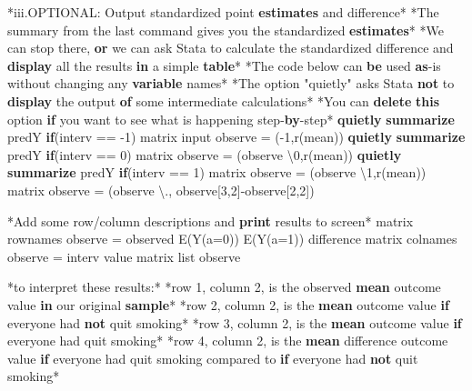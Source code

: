 \documentclass[
  10pt,
]{book}
\newenvironment{Shaded}{\begin{snugshade}}{\end{snugshade}}
\newcommand{\FunctionTok}[1]{\textcolor[rgb]{0.00,0.00,0.00}{#1}}
\newcommand{\KeywordTok}[1]{\textcolor[rgb]{0.13,0.29,0.53}{\textbf{#1}}}
\newcommand{\NormalTok}[1]{#1}
\newcommand{\OtherTok}[1]{\textcolor[rgb]{0.56,0.35,0.01}{#1}}
\newcommand{\StringTok}[1]{\textcolor[rgb]{0.31,0.60,0.02}{#1}}
\begin{document}
\begin{Shaded}
\begin{Highlighting}[]
\NormalTok{*iii.OPTIONAL: Output standardized point }\KeywordTok{estimates}\NormalTok{ and difference*}
\NormalTok{*The summary from the }\FunctionTok{last}\NormalTok{ command gives you the standardized }\KeywordTok{estimates}\NormalTok{*}
\NormalTok{*We can stop there, }\KeywordTok{or}\NormalTok{ we can ask Stata to calculate the standardized difference and }\KeywordTok{display} \OtherTok{all}\NormalTok{ the results }\KeywordTok{in}\NormalTok{ a simple }\KeywordTok{table}\NormalTok{*}
\NormalTok{*The code below can }\KeywordTok{be}\NormalTok{ used }\KeywordTok{as}\NormalTok{{-}is without changing any }\KeywordTok{variable}\NormalTok{ names*}
\NormalTok{*The option }\StringTok{"quietly"}\NormalTok{ asks Stata }\KeywordTok{not}\NormalTok{ to }\KeywordTok{display}\NormalTok{ the output }\KeywordTok{of}\NormalTok{ some intermediate calculations*}
\NormalTok{*You can }\KeywordTok{delete} \KeywordTok{this}\NormalTok{ option }\KeywordTok{if}\NormalTok{ you want to see what is happening step{-}}\KeywordTok{by}\NormalTok{{-}step*}
\KeywordTok{quietly} \KeywordTok{summarize}\NormalTok{ predY }\KeywordTok{if}\NormalTok{(interv == {-}1)}
\FunctionTok{matrix}\NormalTok{ input observe = ({-}1,}\OtherTok{\textasciigrave{}r(mean)\textquotesingle{}}\NormalTok{)}
\KeywordTok{quietly} \KeywordTok{summarize}\NormalTok{ predY }\KeywordTok{if}\NormalTok{(interv == 0)}
\FunctionTok{matrix}\NormalTok{ observe = (observe \textbackslash{}0,}\OtherTok{\textasciigrave{}r(mean)\textquotesingle{}}\NormalTok{)}
\KeywordTok{quietly} \KeywordTok{summarize}\NormalTok{ predY }\KeywordTok{if}\NormalTok{(interv == 1)}
\FunctionTok{matrix}\NormalTok{ observe = (observe \textbackslash{}1,}\OtherTok{\textasciigrave{}r(mean)\textquotesingle{}}\NormalTok{)}
\FunctionTok{matrix}\NormalTok{ observe = (observe \textbackslash{}., observe[3,2]{-}observe[2,2]) }

\NormalTok{*Add some }\OtherTok{row}\NormalTok{/column descriptions and }\KeywordTok{print}\NormalTok{ results to screen*}
\FunctionTok{matrix} \OtherTok{rownames}\NormalTok{ observe = observed E(Y(a=0)) E(Y(a=1)) difference}
\FunctionTok{matrix} \OtherTok{colnames}\NormalTok{ observe = interv }\OtherTok{value}
\FunctionTok{matrix} \OtherTok{list}\NormalTok{ observe }

\NormalTok{*to interpret these results:*}
\NormalTok{*}\OtherTok{row}\NormalTok{ 1, column 2, is the observed }\KeywordTok{mean}\NormalTok{ outcome }\OtherTok{value} \KeywordTok{in}\NormalTok{ our original }\KeywordTok{sample}\NormalTok{*}
\NormalTok{*}\OtherTok{row}\NormalTok{ 2, column 2, is the }\KeywordTok{mean}\NormalTok{ outcome }\OtherTok{value} \KeywordTok{if}\NormalTok{ everyone had }\KeywordTok{not}\NormalTok{ quit smoking*}
\NormalTok{*}\OtherTok{row}\NormalTok{ 3, column 2, is the }\KeywordTok{mean}\NormalTok{ outcome }\OtherTok{value} \KeywordTok{if}\NormalTok{ everyone had quit smoking*}
\NormalTok{*}\OtherTok{row}\NormalTok{ 4, column 2, is the }\KeywordTok{mean}\NormalTok{ difference outcome }\OtherTok{value} \KeywordTok{if}\NormalTok{ everyone had quit smoking compared to }\KeywordTok{if}\NormalTok{ everyone had }\KeywordTok{not}\NormalTok{ quit smoking*}
\end{Highlighting}
\end{Shaded}
\end{document}
